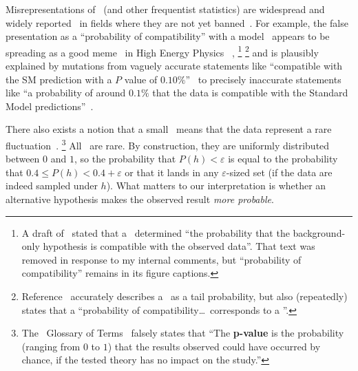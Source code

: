 Misrepresentations of \pvalues\ (and other frequentist statistics) are
widespread and widely reported~\cite{
schervish1996p,
Cohen1994TheEI,
Amrhein2017TheEI,
goodman2008dirty,
greenland2016no,
Bernstein2016princess,
wagenmakers2007practical,
hauer2004harm,
wasserstein2016asa
}
in fields where they are not yet banned~\cite{
Trafimow2015ban,
woolston2015phychology,
chumra2019time,
shrout1997should,
hunter1997needed
}.
For example, the false presentation as a ``probability of compatibility'' with
a model~\cite{HIGG-2018-04} appears to be spreading as a good
meme~\cite{dawkins1989selfish} in High Energy Physics ~\cite{
roth2007fit,
HIGG-2017-09,
HIGG-2018-27,
HIGG-2018-51,
HIGG-2019-14,
EXOT-2016-36,
EXOT-2018-08,
EXOT-2019-15,
HION-2018-19,
chan2019search,
mastrandrea2019searches,
white2019search,
langford2021combination,
IceCube2013search,
IceCube2014searches,
gerasimov2021new
},%
\footnote{%
A draft of~\cite{HIGG-2018-51} stated that a \pvalue\ determined
``the probability that the background-only hypothesis is compatible with the
observed data''.
That text was removed in response to my internal comments, but
``probability of compatibility'' remains in its figure captions.%
}%
\footnote{%
Reference~\cite{HIGG-2018-57} accurately describes a \pvalue\ as a tail
probability, but also (repeatedly) states that a
``probability of compatibility\ldots\ corresponds to a \pvalue''.%
}%
and is plausibly explained by mutations from vaguely accurate statements like
``compatible with the SM prediction with a $P$ value of $0.10\%$''~\cite{
lhcb2021test
}
to precisely inaccurate statements like
``a probability of around $0.1\%$ that the data is compatible with the
Standard Model predictions''~\cite{cern2021test}.

There also exists a notion that a small \pvalue\ means that the data
represent a rare fluctuation~\cite{murray1997use, atlas2022glossary}.%
\footnote{%
The \atlas\ Glossary of Terms~\cite{atlas2022glossary} falsely states that
``The \textbf{p-value} is the probability (ranging from $0$ to $1$) that the
results observed could have occurred by chance, if the tested theory has no
impact on the study.''%
}
All \pvalues\ are rare.
By construction, they are uniformly distributed between $0$ and $1$, so the
probability that $P(h) < \varepsilon$ is equal to the probability that
$0.4 \leq P(h) < 0.4 + \varepsilon$ or that it lands in any
$\varepsilon$-sized set
(if the data are indeed sampled under $h$).
What matters to our interpretation is whether an alternative hypothesis
makes the observed result \emph{more probable}.

